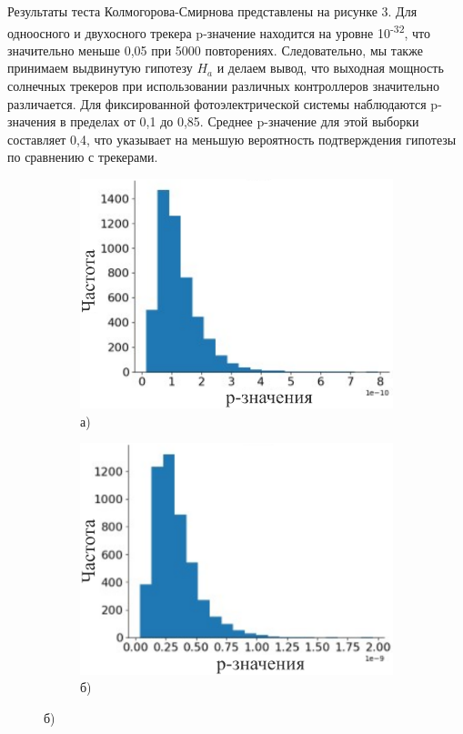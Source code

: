 \begin{multicols}{2}
Результаты теста Колмогорова-Смирнова представлены на рисунке 3. Для
одноосного и двухосного трекера p-значение находится на уровне
10\textsuperscript{-32}, что значительно меньше 0,05 при 5000
повторениях. Следовательно, мы также принимаем выдвинутую гипотезу
\(H_{a}\) и делаем вывод, что выходная мощность солнечных трекеров при
использовании различных контроллеров значительно различается. Для
фиксированной фотоэлектрической системы наблюдаются p-значения в
пределах от 0,1 до 0,85. Среднее p-значение для этой выборки составляет
0,4, что указывает на меньшую вероятность подтверждения гипотезы по
сравнению с трекерами.
\end{multicols}

\begin{figure}[H]
    \centering
    \begin{subfigure}[b]{0.45\textwidth}
        \centering
        \includegraphics[width=\textwidth]{media/ict/image4}
        \caption*{а)}
    \end{subfigure}
    \hfill
    \begin{subfigure}[b]{0.45\textwidth}
        \centering
        \includegraphics[width=\textwidth]{media/ict/image5}
        \caption*{б)}
    \end{subfigure}


\end{figure}
